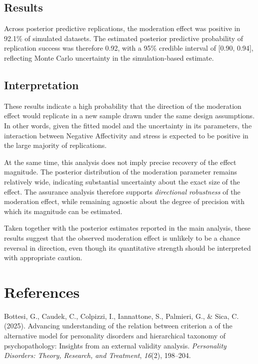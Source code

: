 \documentclass[
  english,
  man,floatsintext]{apa6}
\begin{document}
\subsection{Results}\label{results-2}

Across posterior predictive replications, the moderation effect was positive in 92.1\% of simulated datasets. The estimated posterior predictive probability of replication success was therefore 0.92, with a 95\% credible interval of {[}0.90, 0.94{]}, reflecting Monte Carlo uncertainty in the simulation-based estimate.

\subsection{Interpretation}\label{interpretation-1}

These results indicate a high probability that the direction of the moderation effect would replicate in a new sample drawn under the same design assumptions. In other words, given the fitted model and the uncertainty in its parameters, the interaction between Negative Affectivity and stress is expected to be positive in the large majority of replications.

At the same time, this analysis does not imply precise recovery of the effect magnitude. The posterior distribution of the moderation parameter remains relatively wide, indicating substantial uncertainty about the exact size of the effect. The assurance analysis therefore supports \emph{directional robustness} of the moderation effect, while remaining agnostic about the degree of precision with which its magnitude can be estimated.

Taken together with the posterior estimates reported in the main analysis, these results suggest that the observed moderation effect is unlikely to be a chance reversal in direction, even though its quantitative strength should be interpreted with appropriate caution.

\newpage

\section{References}\label{references}

Bottesi, G., Caudek, C., Colpizzi, I., Iannattone, S., Palmieri, G., \& Sica, C. (2025). Advancing understanding of the relation between criterion a of the alternative model for personality disorders and hierarchical taxonomy of psychopathology: Insights from an external validity analysis. \emph{Personality Disorders: Theory, Research, and Treatment}, \emph{16}(2), 198--204.
\end{document}
